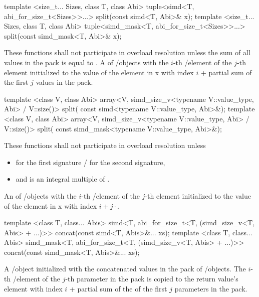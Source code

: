 \begin{itemdecl}
template <size_t... Sizes, class T, class Abi>
tuple<simd<T, abi_for_size_t<Sizes>>...> split(const simd<T, Abi>& x);
template <size_t... Sizes, class T, class Abi>
tuple<simd_mask<T, abi_for_size_t<Sizes>>...> split(const simd_mask<T, Abi>& x);
\end{itemdecl}
\begin{itemdescr}
  \pnum\remarks These functions shall not participate in overload resolution unless the sum of all values in the  pack is equal to .
  \pnum\returns A  of \simd/\mask objects with the $i$-th \simd/\mask element of the $j$-th  element initialized to the value of the element in \code x with index $i$ + partial sum of the first $j$ values in the  pack.
\end{itemdescr}

\begin{itemdecl}
template <class V, class Abi>
array<V, simd_size_v<typename V::value_type, Abi> / V::size()> split(
    const simd<typename V::value_type, Abi>&);
template <class V, class Abi>
array<V, simd_size_v<typename V::value_type, Abi> / V::size()> split(
    const simd_mask<typename V::value_type, Abi>&);
\end{itemdecl}
\begin{itemdescr}
  \pnum\remarks These functions shall not participate in overload resolution unless
  \begin{itemize}
    \item {} for the first signature /  for the second signature,
    \item and  is an integral multiple of .
  \end{itemize}

  \pnum\returns An  of \simd/\mask objects with the $i$-th \simd/\mask element of the $j$-th  element initialized to the value of the element in \code x with index $i + j \cdot $.
\end{itemdescr}

\begin{itemdecl}
template <class T, class... Abis>
simd<T, abi_for_size_t<T, (simd_size_v<T, Abis> + ...)>> concat(const simd<T, Abis>&... xs);
template <class T, class... Abis>
simd_mask<T, abi_for_size_t<T, (simd_size_v<T, Abis> + ...)>> concat(const simd_mask<T, Abis>&... xs);
\end{itemdecl}
\begin{itemdescr}
  \pnum\returns A \simd/\mask object initialized with the concatenated values in the  pack of \simd/\mask objects.
  The $i$-th \simd/\mask element of the $j$-th parameter in the  pack is copied to the return value's element with index $i$ + partial sum of the  of the first $j$ parameters in the  pack.
\end{itemdescr}

